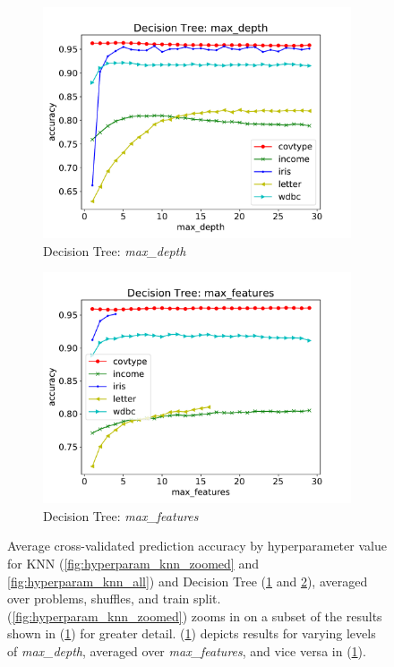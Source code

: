 \documentclass[twoside,11pt]{article}
\begin{document}
\begin{figure}[h]
				\begin{subfigure}[b]{.49\linewidth}
					\includegraphics[width=\linewidth]{dt_hyperparam_max_depth}
					\caption{Decision Tree: \textit{max\_depth}}
					\label{fig:hyperparam_dt_max_depth}
				\end{subfigure}
				\begin{subfigure}[b]{.49\linewidth}
					\includegraphics[width=\linewidth]{dt_hyperparam_max_features}
					\caption{Decision Tree: \textit{max\_features}}
					\label{fig:hyperparam_dt_max_features}
				\end{subfigure}
				
				\caption{Average cross-validated prediction accuracy by hyperparameter value for KNN (\ref{fig:hyperparam_knn_zoomed} and \ref{fig:hyperparam_knn_all}) and Decision Tree (\ref{fig:hyperparam_dt_max_depth} and \ref{fig:hyperparam_dt_max_features}), averaged over problems, shuffles, and train split. (\ref{fig:hyperparam_knn_zoomed}) zooms in on a subset of the results shown in (\ref{fig:hyperparam_dt_max_depth}) for greater detail. (\ref{fig:hyperparam_dt_max_depth}) depicts results for varying levels of \textit{max\_depth}, averaged over \textit{max\_features}, and vice versa in (\ref{fig:hyperparam_dt_max_depth}).}
				\label{fig:hyperparam_knn_dt}
			\end{figure}
			
\end{document}
